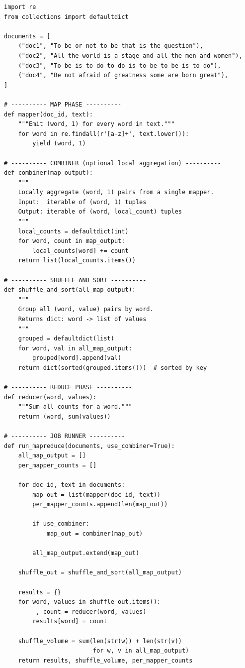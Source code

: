 \begin{lstlisting}[style=pyspark, caption={PE4.1: MapReduce word count with Combiner}]
import re
from collections import defaultdict

documents = [
    ("doc1", "To be or not to be that is the question"),
    ("doc2", "All the world is a stage and all the men and women"),
    ("doc3", "To be is to do to do is to be to be is to do"),
    ("doc4", "Be not afraid of greatness some are born great"),
]

# ---------- MAP PHASE ----------
def mapper(doc_id, text):
    """Emit (word, 1) for every word in text."""
    for word in re.findall(r'[a-z]+', text.lower()):
        yield (word, 1)

# ---------- COMBINER (optional local aggregation) ----------
def combiner(map_output):
    """
    Locally aggregate (word, 1) pairs from a single mapper.
    Input:  iterable of (word, 1) tuples
    Output: iterable of (word, local_count) tuples
    """
    local_counts = defaultdict(int)
    for word, count in map_output:
        local_counts[word] += count
    return list(local_counts.items())

# ---------- SHUFFLE AND SORT ----------
def shuffle_and_sort(all_map_output):
    """
    Group all (word, value) pairs by word.
    Returns dict: word -> list of values
    """
    grouped = defaultdict(list)
    for word, val in all_map_output:
        grouped[word].append(val)
    return dict(sorted(grouped.items()))  # sorted by key

# ---------- REDUCE PHASE ----------
def reducer(word, values):
    """Sum all counts for a word."""
    return (word, sum(values))

# ---------- JOB RUNNER ----------
def run_mapreduce(documents, use_combiner=True):
    all_map_output = []
    per_mapper_counts = []

    for doc_id, text in documents:
        map_out = list(mapper(doc_id, text))
        per_mapper_counts.append(len(map_out))

        if use_combiner:
            map_out = combiner(map_out)

        all_map_output.extend(map_out)

    shuffle_out = shuffle_and_sort(all_map_output)

    results = {}
    for word, values in shuffle_out.items():
        _, count = reducer(word, values)
        results[word] = count

    shuffle_volume = sum(len(str(w)) + len(str(v))
                         for w, v in all_map_output)
    return results, shuffle_volume, per_mapper_counts


\end{lstlisting}
